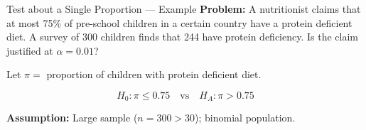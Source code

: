 \documentclass[12pt, aspectratio=169]{beamer}
\begin{document}
    \begin{frame}{Test about a Single Proportion --- Example}
        \textbf{Problem:} A nutritionist claims that at most 75\% of pre-school
        children in a certain country have a protein deficient diet.
        A survey of 300 children finds that 244 have protein deficiency.
        Is the claim justified at $\alpha = 0.01$?

        \vspace{0.8em}

        Let $\pi = $ proportion of children with protein deficient diet.

        \[
            H_0: \pi \leqslant 0.75 \quad \text{vs} \quad H_A: \pi > 0.75
        \]

        \vspace{0.5em}

        \textbf{Assumption:} Large sample ($n = 300 > 30$); binomial population.
    \end{frame}
\end{document}
